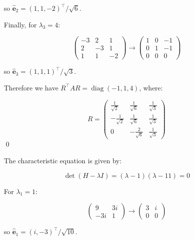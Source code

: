 \documentclass[12pt]{article}
\begin{document}
so $\hat{\mathbf{e}}_{2} = (1, 1, -2)^{\intercal}/\sqrt{6}$.

Finally, for $\lambda_{3} = 4$:

\begin{equation}
    \begin{pmatrix}
        -3 & 2  & 1  \\
        2  & -3 & 1  \\
        1  & 1  & -2
    \end{pmatrix}
    \to
    \begin{pmatrix}
        1 & 0 & -1 \\
        0 & 1 & -1 \\
        0 & 0 & 0
    \end{pmatrix}
\end{equation}

so $\hat{\mathbf{e}}_{3} = (1, 1, 1)^{\intercal}/\sqrt{3}$.

Therefore we have $R^{\intercal}AR = \operatorname{diag}(-1, 1, 4)$, where:

\begin{equation}
    R =
    \begin{pmatrix}
        \frac{1}{\sqrt{2}}  & \frac{1}{\sqrt{6}}  & \frac{1}{\sqrt{3}} \\
        -\frac{1}{\sqrt{2}} & \frac{1}{\sqrt{6}}  & \frac{1}{\sqrt{3}} \\
        0                   & -\frac{2}{\sqrt{6}} & \frac{1}{\sqrt{3}}
    \end{pmatrix}
\end{equation}
\qed


The characteristic equation is given by:

\begin{equation}
    \det(H - \lambda I) = (\lambda - 1)(\lambda - 11) = 0
\end{equation}

For $\lambda_{1} = 1$:

\begin{equation}
    \begin{pmatrix}
        9   & 3i \\
        -3i & 1
    \end{pmatrix}
    \to
    \begin{pmatrix}
        3 & i \\
        0 & 0
    \end{pmatrix}
\end{equation}

so $\hat{\mathbf{e}}_{1} = (i, -3)^{\intercal}/\sqrt{10}$.
\end{document}
